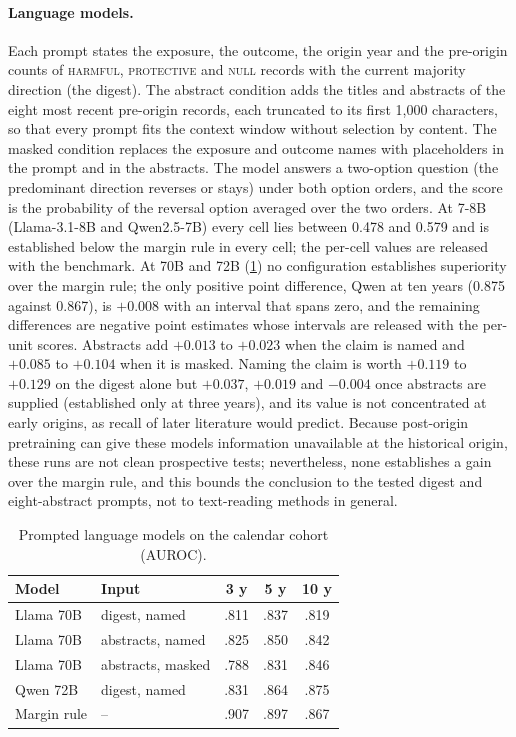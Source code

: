 \documentclass[11pt]{article}
\begin{document}
\paragraph{Language models.} Each prompt states the exposure, the outcome, the origin year and the
pre-origin counts of \textsc{harmful}, \textsc{protective} and \textsc{null} records with the current
majority direction (the digest). The abstract condition adds the titles and abstracts of the eight most
recent pre-origin records, each truncated to its first 1{,}000 characters, so that every prompt fits the
context window without selection by content. The masked condition replaces the exposure and outcome
names with placeholders in the prompt and in the abstracts. The model answers a two-option question
(the predominant direction reverses or stays) under both option orders, and the score is the
probability of the reversal option averaged over the two orders. At 7-8B (Llama-3.1-8B and Qwen2.5-7B) every cell lies
between 0.478 and 0.579 and is established below the margin rule in every cell; the per-cell values are released
with the benchmark. At 70B and 72B (\cref{tab:llmtext}) no configuration establishes superiority over the margin rule; the only positive point difference, Qwen at ten years (0.875 against 0.867), is $+0.008$ with an interval that
spans zero, and the remaining differences are negative point estimates whose intervals are released
with the per-unit scores. Abstracts add $+0.013$ to $+0.023$ when the claim is named and $+0.085$ to $+0.104$ when it
is masked. Naming the claim is worth $+0.119$ to $+0.129$ on the digest alone but $+0.037$, $+0.019$
and $-0.004$ once abstracts are supplied (established only at three years), and its value is not
concentrated at early origins, as recall of later literature would predict. Because post-origin pretraining
can give these models information unavailable at the historical origin, these runs are not clean
prospective tests; nevertheless, none establishes a gain over the margin rule, and this bounds the conclusion to the tested digest and eight-abstract prompts, not to text-reading methods in general.

\begin{table}[!t]\centering\footnotesize
\setlength{\tabcolsep}{4pt}
\begin{tabular}{@{}llccc@{}}
\toprule
Model & Input & 3 y & 5 y & 10 y \\
\midrule
Llama 70B & digest, named & .811 & .837 & .819 \\
Llama 70B & abstracts, named & .825 & .850 & .842 \\
Llama 70B & abstracts, masked & .788 & .831 & .846 \\
Qwen 72B & digest, named & .831 & .864 & .875 \\
\midrule
Margin rule & -- & .907 & .897 & .867 \\
\bottomrule
\end{tabular}
\caption{Prompted language models on the calendar cohort (AUROC).}
\label{tab:llmtext}
\end{table}
\end{document}
